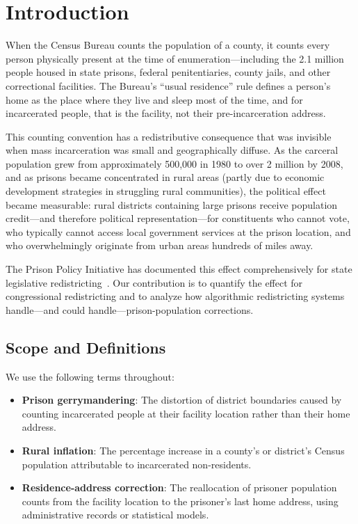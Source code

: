 \section{Introduction}

When the Census Bureau counts the population of a county, it counts every person physically present at the time of enumeration---including the 2.1 million people housed in state prisons, federal penitentiaries, county jails, and other correctional facilities. The Bureau's ``usual residence'' rule defines a person's home as the place where they live and sleep most of the time, and for incarcerated people, that is the facility, not their pre-incarceration address.

This counting convention has a redistributive consequence that was invisible when mass incarceration was small and geographically diffuse. As the carceral population grew from approximately 500,000 in 1980 to over 2 million by 2008, and as prisons became concentrated in rural areas (partly due to economic development strategies in struggling rural communities), the political effect became measurable: rural districts containing large prisons receive population credit---and therefore political representation---for constituents who cannot vote, who typically cannot access local government services at the prison location, and who overwhelmingly originate from urban areas hundreds of miles away.

The Prison Policy Initiative has documented this effect comprehensively for state legislative redistricting~\citep{wagner2002importing, wagner2004prison}. Our contribution is to quantify the effect for congressional redistricting and to analyze how algorithmic redistricting systems handle---and could handle---prison-population corrections.

\subsection{Scope and Definitions}

We use the following terms throughout:
\begin{itemize}
    \item \textbf{Prison gerrymandering}: The distortion of district boundaries caused by counting incarcerated people at their facility location rather than their home address.
    \item \textbf{Rural inflation}: The percentage increase in a county's or district's Census population attributable to incarcerated non-residents.
    \item \textbf{Residence-address correction}: The reallocation of prisoner population counts from the facility location to the prisoner's last home address, using administrative records or statistical models.
\end{itemize}

